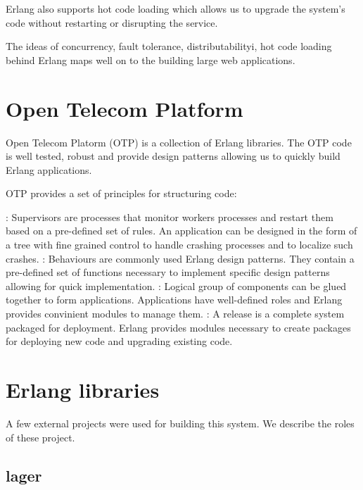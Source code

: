 Erlang also supports hot code loading which allows us to upgrade the system's
code without restarting or disrupting the service.

The ideas of concurrency, fault tolerance, distributabilityi, hot code loading
behind Erlang maps well on to the building large web applications.


\section{Open Telecom Platform}

Open Telecom Platorm (OTP) is a collection of Erlang libraries. The OTP code is
well tested, robust and provide design patterns allowing us to quickly build 
Erlang applications.

OTP provides a set of principles for structuring code:

\begin{itemize}
    : Supervisors are processes that monitor workers 
    processes and restart them based on a pre-defined set of rules. An 
    application can be designed in the form of a tree with fine grained
    control to handle crashing processes and to localize such crashes.
    : Behaviours are commonly used Erlang design patterns.
    They contain a pre-defined set of functions necessary to implement
    specific design patterns allowing for quick implementation.
    : Logical group of components can be glued together
    to form applications. Applications have well-defined roles and Erlang
    provides convinient modules to manage them.
    : A release is a complete system packaged for deployment.
    Erlang provides modules necessary to create packages for deploying new
    code and upgrading existing code.
\end{itemize}

\section{Erlang libraries}

A few external projects were used for building this system. We describe the
roles of these project.

\subsection{lager}

